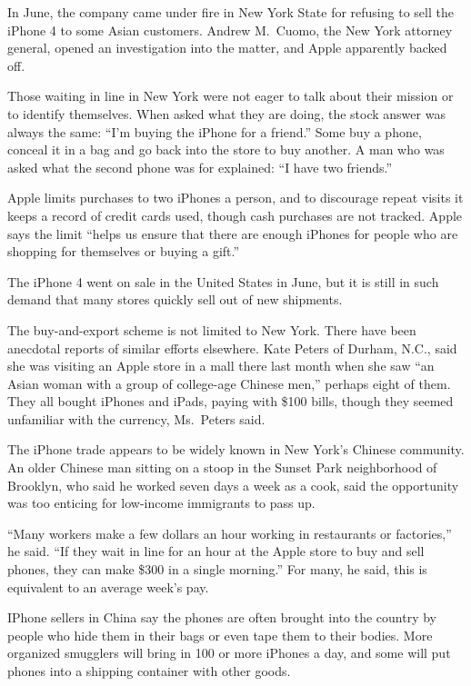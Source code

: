 ﻿\documentclass[12pt]{article}
\begin{document}
In June, the company came under fire in New York State for refusing to sell the iPhone 4 to some
Asian customers. Andrew M.~Cuomo, the New York attorney general, opened an investigation into the
matter, and Apple apparently backed off.

Those waiting in line in New York were not eager to talk about their mission or to identify
themselves. When asked what they are doing, the stock answer was always the same: ``I'm buying the
iPhone for a friend.'' Some buy a phone, conceal it in a bag and go back into the store to buy
another. A man who was asked what the second phone was for explained: ``I have two friends.''

Apple limits purchases to two iPhones a person, and to discourage repeat visits it keeps a record of
credit cards used, though cash purchases are not tracked. Apple says the limit ``helps us ensure
that there are enough iPhones for people who are shopping for themselves or buying a gift.''

The iPhone 4 went on sale in the United States in June, but it is still in such demand that many
stores quickly sell out of new shipments.

The buy-and-export scheme is not limited to New York. There have been anecdotal reports of similar
efforts elsewhere. Kate Peters of Durham, N.C., said she was visiting an Apple store in a mall there
last month when she saw ``an Asian woman with a group of college-age Chinese men,'' perhaps eight of
them. They all bought iPhones and iPads, paying with \$100 bills, though they seemed unfamiliar with
the currency, Ms.~Peters said.

The iPhone trade appears to be widely known in New York's Chinese community. An older Chinese man
sitting on a stoop in the Sunset Park neighborhood of Brooklyn, who said he worked seven days a week
as a cook, said the opportunity was too enticing for low-income immigrants to pass up.

``Many workers make a few dollars an hour working in restaurants or factories,'' he said. ``If they
wait in line for an hour at the Apple store to buy and sell phones, they can make \$300 in a single
morning.'' For many, he said, this is equivalent to an average week's pay.

IPhone sellers in China say the phones are often brought into the country by people who hide them in
their bags or even tape them to their bodies. More organized smugglers will bring in 100 or more
iPhones a day, and some will put phones into a shipping container with other goods.
\end{document}
